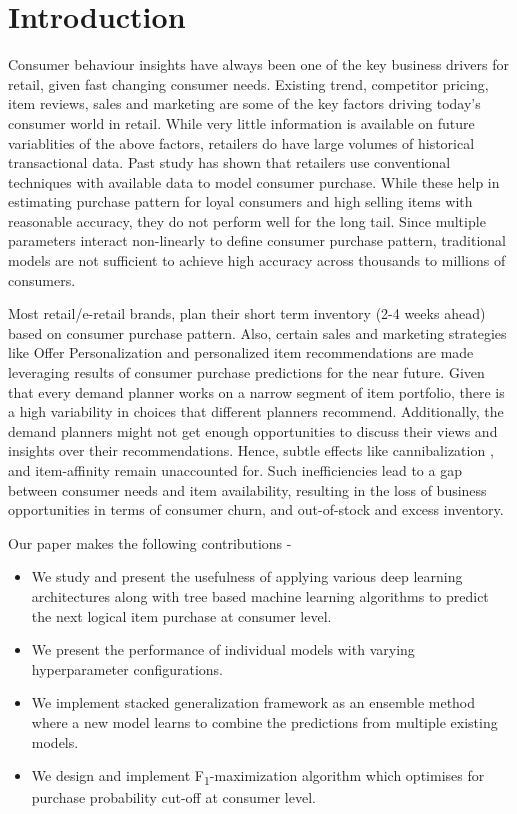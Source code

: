 \section{Introduction}
Consumer behaviour insights have always been one of the key business drivers for retail, given
fast changing consumer needs. Existing trend, competitor pricing, item reviews, sales and marketing are some of the 
key factors driving today's consumer world in retail. While very little information is available
on future variablities of the above factors, retailers do have large volumes of historical transactional data. Past study 
\cite{choudhury2019machine} has shown that retailers use conventional techniques with available data to model consumer purchase. 
While these help in estimating purchase pattern for loyal consumers and high selling items with reasonable accuracy, they 
do not perform well for the long tail. Since multiple parameters interact non-linearly to define consumer purchase pattern,
traditional models are not sufficient to achieve high accuracy across thousands to millions of consumers.

Most retail/e-retail brands, plan their short term inventory (2-4 weeks ahead)  based on consumer 
purchase pattern. Also, certain sales and marketing strategies like Offer Personalization and personalized item
recommendations are made leveraging results of consumer purchase predictions for the near future.
Given that every demand planner works on a narrow segment of item portfolio, there is a high 
variability in choices that different planners recommend. Additionally, the demand planners might not get enough opportunities 
to discuss their views and insights over their recommendations. Hence, subtle effects like cannibalization
\cite{shah2007retailer}, and item-affinity remain unaccounted for. Such inefficiencies lead to a gap between consumer needs 
and item availability, resulting in the loss of business opportunities in terms of consumer churn, and out-of-stock
and excess inventory.

Our paper makes the following contributions -
\begin{itemize}
\item We study and present the usefulness of applying various deep learning architectures along with tree based machine 
learning algorithms to predict the next logical item purchase at consumer level.
\item We present the performance of individual models with varying hyperparameter configurations.
\item We implement stacked generalization framework \cite{wolpert1992stacked} as an ensemble method where a new model learns 
to combine the predictions from multiple existing models.
\item We design and implement F\textsubscript{1}-maximization algorithm which optimises for purchase probability cut-off 
at consumer level.
\end{itemize}
